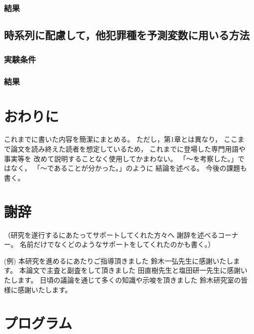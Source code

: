 \documentclass[12pt,a4paper,oneside]{jsbook}
\theoremstyle{plain}
\begin{document}
\subsection{結果}

\section{時系列に配慮して，他犯罪種を予測変数に用いる方法}
\subsection{実験条件}
\subsection{結果}

\chapter{おわりに}
これまでに書いた内容を簡潔にまとめる。
ただし，第1章とは異なり，
ここまで論文を読み終えた読者を想定しているため，
これまでに登場した専門用語や事実等を
改めて説明することなく使用してかまわない。
「～を考察した。」ではなく，
「～であることが分かった。」のように
結論を述べる。
今後の課題も書く。


\chapter*{謝辞}
（研究を遂行するにあたってサポートしてくれた方々へ
謝辞を述べるコーナー。
名前だけでなくどのようなサポートをしてくれたのかも書く。）

(例)
本研究を進めるにあたりご指導頂きました
鈴木一弘先生に感謝いたします。
本論文で主査と副査をして頂きました
田直樹先生と塩田研一先生に感謝いたします。
日頃の議論を通じて多くの知識や示唆を頂きました
鈴木研究室の皆様に感謝いたします。



\appendix
\chapter{プログラム}
\label{program}


\end{document}
